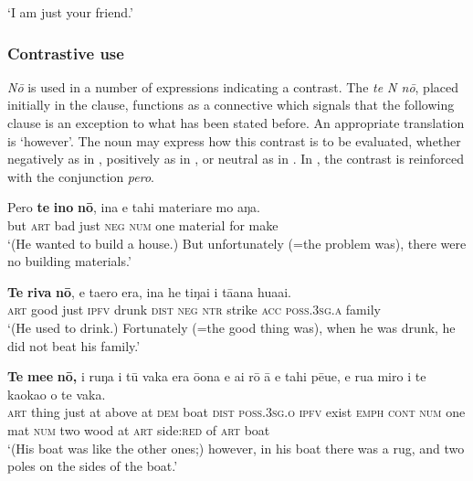 \glt 
‘I am just your friend.’ \textstyleExampleref{[R308.032]} 
\z

\subsubsection[Contrastive use]{Contrastive use}\label{sec:5.8.2.4}

\textit{Nō} is used in a number of expressions indicating a contrast. The  \textit{te N nō}, placed initially in the clause, functions as a connective which signals that the following clause is an exception to what has been stated before. An appropriate translation is ‘however’. The noun may express how this contrast is to be evaluated, whether negatively as in , positively as in , or neutral as in . In , the contrast is reinforced with the  conjunction \textit{pero}.

\ea\label{ex:5.151}
\gll Pero \textbf{te} \textbf{{\ꞌ}ino} \textbf{nō}, {\ꞌ}ina e tahi materiare mo aŋa.\\
but \textsc{art} bad just \textsc{neg} \textsc{num} one material for make\\

\glt 
‘(He wanted to build a house.) But unfortunately (=the problem was), there were no building materials.’ \textstyleExampleref{[R231.156]} 
\z

\ea\label{ex:5.152}
\gll \textbf{Te} \textbf{riva} \textbf{nō}, e ta{\ꞌ}ero era, {\ꞌ}ina he tiŋa{\ꞌ}i i tā{\ꞌ}ana hua{\ꞌ}ai. \\
\textsc{art} good just \textsc{ipfv} drunk \textsc{dist} \textsc{neg} \textsc{ntr} strike \textsc{acc} \textsc{poss.3sg.a} family \\

\glt 
‘(He used to drink.) Fortunately (=the good thing was), when he was drunk, he did not beat his family.’ \textstyleExampleref{[R309.056]} 
\z

\ea\label{ex:5.153}
\gll \textbf{Te} \textbf{me{\ꞌ}e} \textbf{nō,} {\ꞌ}i ruŋa i tū vaka era ō{\ꞌ}ona e ai rō {\ꞌ}ā e tahi pē{\ꞌ}ue, e rua miro {\ꞌ}i te kaokao o te vaka. \\
\textsc{art} thing just at above at \textsc{dem} boat \textsc{dist} \textsc{poss.3sg.o} \textsc{ipfv} exist \textsc{emph} \textsc{cont} \textsc{num} one mat \textsc{num} two wood at \textsc{art} side:\textsc{red} of \textsc{art} boat \\

\glt 
‘(His boat was like the other ones;) however, in his boat there was a rug, and two poles on the sides of the boat.’ \textstyleExampleref{[R344.040]} 
\z
{}

